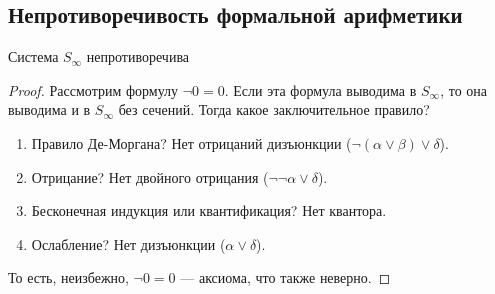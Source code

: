 \subsection{Непротиворечивость формальной арифметики}
\begin{theorem}
  Система $S_\infty$ непротиворечива
\end{theorem}
\begin{proof}
Рассмотрим формулу $\neg 0=0$.
Если эта формула выводима в $S_\infty$, то она выводима и в $S_\infty$ без сечений.
Тогда какое заключительное правило?
\begin{enumerate}
\item Правило Де-Моргана?  Нет отрицаний дизъюнкции ($\neg(\alpha\vee\beta)\vee\delta$).
\item Отрицание?  Нет двойного отрицания ($\neg\neg\alpha\vee\delta$).
\item Бесконечная индукция или квантификация?  Нет квантора.
\item Ослабление?  Нет дизъюнкции ($\alpha \vee \delta$).
\end{enumerate}

То есть, неизбежно, $\neg 0=0$ --- аксиома, что также неверно.
\end{proof}
